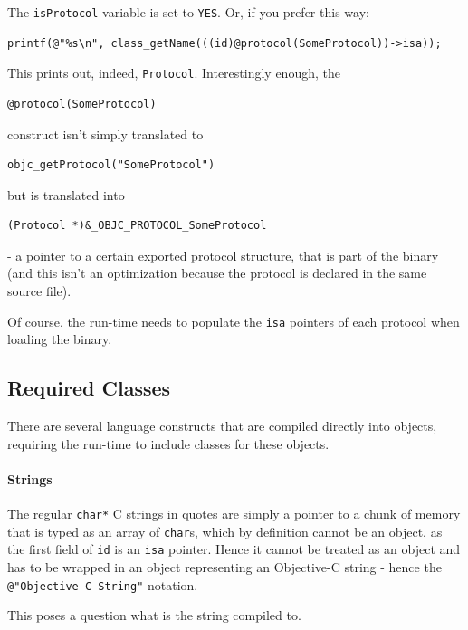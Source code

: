The \verb=isProtocol= variable is set to \verb=YES=. Or, if you prefer this way:

\begin{verbatim}
printf(@"%s\n", class_getName(((id)@protocol(SomeProtocol))->isa));
\end{verbatim}

This prints out, indeed, \verb=Protocol=. Interestingly enough, the

\begin{verbatim}@protocol(SomeProtocol)\end{verbatim}
  
construct isn't simply translated to

\begin{verbatim}objc_getProtocol("SomeProtocol")\end{verbatim}

but is translated into 

\begin{verbatim}(Protocol *)&_OBJC_PROTOCOL_SomeProtocol\end{verbatim}

- a pointer to a certain exported protocol structure, that is part of the binary (and this isn't an optimization because the protocol is declared in the same source file).

Of course, the run-time needs to populate the \verb=isa= pointers of each protocol when loading the binary.

\subsection{Required Classes}

There are several language constructs that are compiled directly into objects, requiring the run-time to include classes for these objects.

\paragraph{Strings} The regular \verb=char*= C strings in quotes are simply a pointer to a chunk of memory that is typed as an array of \verb=char=s, which by definition cannot be an object, as the first field of \verb=id= is an \verb=isa= pointer. Hence it cannot be treated as an object and has to be wrapped in an object representing an Objective-C string - hence the \verb=@"Objective-C String"= notation.

This poses a question what is the string compiled to.

